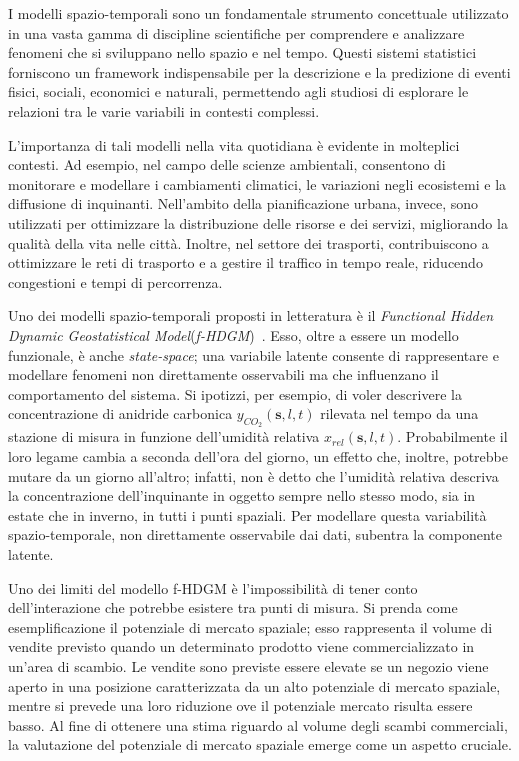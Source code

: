 
I modelli spazio-temporali sono un fondamentale strumento concettuale utilizzato in una vasta gamma di discipline scientifiche per comprendere e analizzare fenomeni che si sviluppano nello spazio e nel tempo. Questi sistemi statistici forniscono un framework indispensabile per la descrizione e la predizione di eventi fisici, sociali, economici e naturali, permettendo agli studiosi di esplorare le relazioni tra le varie variabili in contesti complessi.
\par L'importanza di tali modelli nella vita quotidiana è evidente in molteplici contesti. Ad esempio, nel campo delle scienze ambientali, consentono di monitorare e modellare i cambiamenti climatici, le variazioni negli ecosistemi e la diffusione di inquinanti. Nell'ambito della pianificazione urbana, invece, sono utilizzati per ottimizzare la distribuzione delle risorse e dei servizi, migliorando la qualità della vita nelle città. Inoltre, nel settore dei trasporti, contribuiscono a ottimizzare le reti di trasporto e a gestire il traffico in tempo reale, riducendo congestioni e tempi di percorrenza.
\par Uno dei modelli spazio-temporali proposti in letteratura è il \textit{Functional Hidden Dynamic Geostatistical Model}(\textit{f-HDGM})~\cite{paper_f_HDGM}. Esso, oltre a essere un modello funzionale, è anche \textit{state-space}; una variabile latente consente di rappresentare e modellare fenomeni non direttamente osservabili ma che influenzano il comportamento del sistema. Si ipotizzi, per esempio, di voler descrivere la concentrazione di anidride carbonica $y_{CO_2}(\mathbf{s}, l, t)$ rilevata nel tempo da una stazione di misura in funzione dell'umidità relativa $x_{rel}(\mathbf{s}, l, t)$. Probabilmente il loro legame cambia a seconda dell'ora del giorno, un effetto che, inoltre, potrebbe mutare da un giorno all'altro; infatti, non è detto che l'umidità relativa descriva la concentrazione dell'inquinante in oggetto sempre nello stesso modo, sia in estate che in inverno, in tutti i punti spaziali. Per modellare questa variabilità spazio-temporale, non direttamente osservabile dai dati, subentra la componente latente.
\par Uno dei limiti del modello f-HDGM è l'impossibilità di tener conto dell'interazione che potrebbe esistere tra punti di misura. Si prenda come esemplificazione il potenziale di mercato spaziale; esso rappresenta il volume di vendite previsto quando un determinato prodotto viene commercializzato in un'area di scambio. Le vendite sono previste essere elevate se un negozio viene aperto in una posizione caratterizzata da un alto potenziale di mercato spaziale, mentre si prevede una loro riduzione ove il potenziale mercato risulta essere basso. Al fine di ottenere una stima riguardo al volume degli scambi commerciali, la valutazione del potenziale di mercato spaziale emerge come un aspetto cruciale. 
